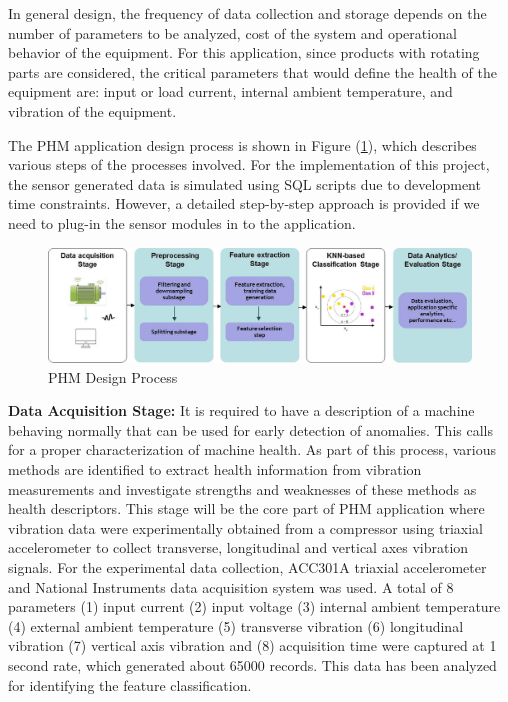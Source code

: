 \documentclass[sigconf]{acmart}
\begin{document}
In general design, the frequency of data collection and storage depends on the number of parameters to be analyzed, cost of the system and operational behavior of the equipment. For this application, since products with rotating parts are considered, the critical parameters that would define the health of the equipment are: input or load current, internal ambient temperature, and vibration of the equipment.

The PHM application design process is shown in Figure (\ref{fig:Figure2}), which describes various steps of the processes involved. For the implementation of this project, the sensor generated data is simulated using SQL scripts due to development time constraints. However, a detailed step-by-step approach is provided if we need to plug-in the sensor modules in to the application.



\begin{figure}
\includegraphics[width=1.0\columnwidth]{images/phm_process_1}
\caption{PHM Design Process} \label{fig:Figure2}
\end{figure}



\textbf{Data Acquisition Stage:} It is required to have a description of a machine behaving normally that can be used for
early detection of anomalies. This calls for a proper characterization of machine health. As part of this process, various methods are identified to extract health information from vibration measurements and investigate strengths and weaknesses of these methods as health descriptors. This stage will be the core part of PHM application where vibration data were experimentally obtained from a compressor using triaxial accelerometer to collect transverse, longitudinal and vertical axes vibration signals. For the experimental data collection, ACC301A triaxial accelerometer and National Instruments data acquisition system was used. A total of 8 parameters (1) input current (2) input voltage (3) internal ambient temperature (4) external ambient temperature (5) transverse vibration (6) longitudinal vibration (7) vertical axis vibration and (8) acquisition time were captured at 1 second rate, which generated about 65000 records. This data has been analyzed for identifying the feature classification.
\end{document}
